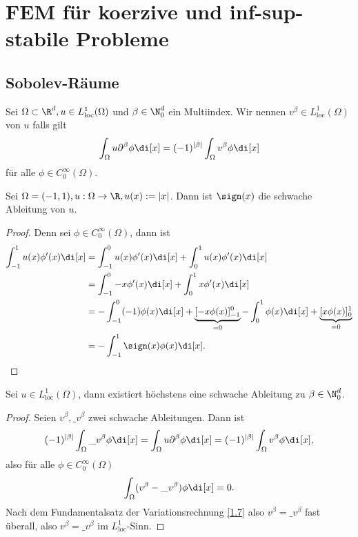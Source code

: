 \chapter{FEM für koerzive und inf-sup-stabile Probleme} \label{chap:3}


\section{Sobolev-Räume} \label{sec:3.1}


\begin{df} \label{3.1}
	Sei $\Omega \subset \R^d, u \in L_{\text{loc}}^1(\Omega)$ und $\beta \in \N_0^d$ ein Multiindex.
	Wir nennen $v^\beta \in L_{\text{loc}}^1(\Omega)$  von $u$ falls gilt
	\[
		\int_\Omega u \partial^\beta \phi \di[x]
		= (-1)^{|\beta|} \int_\Omega v^\beta \phi \di[x]
	\]
	für alle $\phi \in C_0^\infty(\Omega)$.
\end{df}

\begin{ex*}
	Sei $\Omega = (-1, 1), u: \Omega \to \R, u(x) := |x|$.
	Dann ist $\sign(x)$ die schwache Ableitung von $u$.
	\begin{proof}
		Denn sei $\phi \in C_0^\infty(\Omega)$, dann ist
		\begin{align*}
			\int_{-1}^1 u(x) \phi'(x) \di[x]
			&= \int_{-1}^0 u(x) \phi'(x) \di[x]
			+ \int_0^1 u(x) \phi'(x) \di[x] \\
			&= \int_{-1}^0 -x \phi'(x) \di[x]
			+ \int_0^1 x \phi'(x) \di[x] \\
			&= - \int_{-1}^0 (-1) \phi(x) \di[x] + \underbrace{[-x \phi(x)]_{-1}^0}_{=0}
			- \int_0^1 \phi(x) \di[x] + \underbrace{[x \phi(x)]_0^1}_{=0} \\
			&= - \int_{-1}^1 \sign(x) \phi(x) \di[x].
		\end{align*}
	\end{proof}
\end{ex*}

\begin{st}[Eindeutigkeit] \label{3.2}
	Sei $u \in L^1_{\text{loc}}(\Omega)$, dann existiert höchstens eine schwache Ableitung zu $\beta \in \N_0^d$.
	\begin{proof}
		Seien $v^\beta, \_v^\beta$ zwei schwache Ableitungen.
		Dann ist
		\[
			(-1)^{|\beta|} \int_\Omega \_v^\beta \phi \di[x]
			= \int_\Omega u \partial^\beta \phi \di[x]
			= (-1)^{|\beta|} \int_\Omega v^\beta \phi \di[x],
		\]
		also für alle $\phi \in C_0^\infty(\Omega)$
		\[
			\int_\Omega (v^\beta - \_v^\beta) \phi \di[x] = 0.
		\]
		Nach dem Fundamentalsatz der Variationsrechnung \ref{1.7} also $v^\beta = \_v^\beta$ fast überall, also $v^\beta = \_v^\beta$ im $L^1_{\text{loc}}$-Sinn.
	\end{proof}
\end{st}

